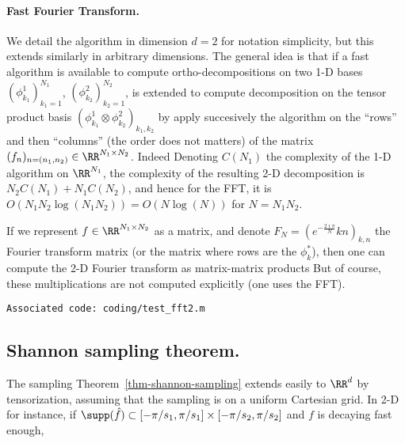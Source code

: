 \paragraph{Fast Fourier Transform.}

We detail the algorithm in dimension $d=2$ for notation simplicity, but this extends similarly in arbitrary dimensions. 
%
The general idea is that if a fast algorithm is available to compute ortho-decompositions on two 1-D bases $(\phi_{k_1}^{1})_{k_1=1}^{N_1}$, $(\phi_{k_2}^{2})_{k_2=1}^{N_2}$, is extended to compute decomposition on the tensor product basis 
$(\phi_{k_1}^{1} \otimes \phi_{k_2}^{2})_{k_1,k_2}$ by apply succesively the algorithm on the ``rows'' and then ``columns'' (the order does not matters) of the matrix $(f_n)_{n=(n_1,n_2)} \in \RR^{N_1 \times N_2}$. 
%
Indeed
Denoting $C(N_1)$ the complexity of the 1-D algorithm on $\RR^{N_1}$, the complexity of the resulting 2-D decomposition is $N_2 C(N_1)+N_1 C(N_2)$, and hence for the FFT, it is $O(N_1 N_2 \log(N_1 N_2))=O(N \log(N))$ for $N=N_1 N_2$.

If we represent $f \in \RR^{N_1 \times N_2}$ as a matrix, and denote $F_N=(e^{-\frac{2\imath\pi}{N}}kn)_{k,n}$ the Fourier transform matrix (or the matrix where rows are the $\phi_k^*$), then one can compute the 2-D Fourier transform as matrix-matrix products
But of course, these multiplications are not computed explicitly (one uses the FFT).



\texttt{Associated code: coding/test\_fft2.m}


\subsection{Shannon sampling theorem.}

The sampling Theorem~\ref{thm-shannon-sampling} extends easily to $\RR^d$ by tensorization, assuming that the sampling is on a uniform Cartesian grid. In 2-D for instance, if $\supp(\hat f) \subset [-\pi/s_1,\pi/s_1] \times [-\pi/s_2,\pi/s_2]$ and $f$ is decaying fast enough, 
	

